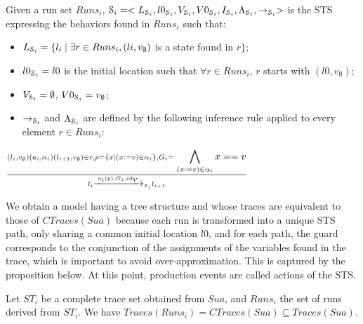 \begin{definition}
  Given a run set $Runs_i$, $\EuScript{S}_i=<L_{\EuScript{S}_i},
  l0_{\EuScript{S}_i},V_{\EuScript{S}_i}, V0_{\EuScript{S}_i},
  I_{\EuScript{S}_i},\\
  \Lambda_{\EuScript{S}_i},\rightarrow_{\EuScript{S}_i}>$ is the
  STS expressing the behaviors found in $Runs_i$ such that:

	\begin{itemize}
    \item $L_{\EuScript{S}_i}= \{l_i \mid \exists r\in Runs_i,
      (li,v_\emptyset)$ is a state found in $r\}$;

    \item $l0_{\EuScript{S}_i} = l0$ is the initial location
      such that $\forall r \in Runs_i$, $r$ starts with
      $(l0,v_\emptyset)$;

    \item $V_{\EuScript{S}_i}=\emptyset$, $V0_{\EuScript{S}_i}=v_\emptyset$;

    \item $\rightarrow_{\EuScript{S}_i}$ and
      $\Lambda_{\EuScript{S}_i}$ are defined by the following
      inference rule applied to every element $r\in Runs_i$:
	\end{itemize}

  \begin{center}
    {\Large
    $\frac{(l_i,v_\emptyset) (a_i,\alpha_i) (l_{i+1},v_\emptyset)
    \in r, p=\{x \mid (x:=v)\in \alpha_i \}, G_i=\displaystyle
  \bigwedge_{(x:=v)\in \alpha_i}x==v}{l_i \xrightarrow{a_i(p),G_i,id_V}_{\EuScript{S}_i} l_{i+1}}$
    }
  \end{center}


  \label{def:runset_to_sts}
\end{definition}

We obtain a model having a tree structure and whose traces are
equivalent \cite{petrenko06} to those of $CTraces(Sua)$ because
each run is transformed into a unique STS path, only sharing a
common initial location $l0$, and for each path, the guard
corresponds to the conjunction of the assignments of the
variables found in the trace, which is important to avoid
over-approximation. This is captured by the proposition below. At
this point, production events are called actions of the STS.

\begin{proposition}
    Let $ST_i$ be a complete trace set obtained from
    $\mathit{Sua}$, and $Runs_i$ the set of runs derived from
    $ST_i$.
    We have $Traces(Runs_i) = CTraces(Sua) \subseteq Traces(Sua)$.

    \label{}
\end{proposition}

